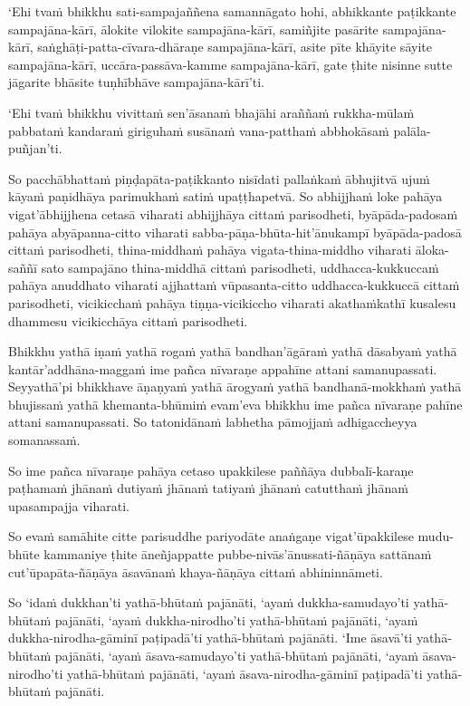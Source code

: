 `Ehi tvaṁ bhikkhu sati-sampajaññena samannāgato hohi, abhikkante paṭikkante sampajāna-kārī, ālokite vilokite sampajāna-kārī, samiñjite pasārite sampajāna-kārī, saṅghāṭi-patta-cīvara-dhāraṇe sampajāna-kārī, asite pīte khāyite sāyite sampajāna-kārī, uccāra-passāva-kamme sampajāna-kārī, gate ṭhite nisinne sutte jāgarite bhāsite tuṇhībhāve sampajāna-kārī'ti.

`Ehi tvaṁ bhikkhu vivittaṁ sen'āsanaṁ bhajāhi araññaṁ rukkha-mūlaṁ pabbataṁ kandaraṁ giriguhaṁ susānaṁ vana-patthaṁ abbhokāsaṁ palāla-puñjan'ti.

So pacchābhattaṁ piṇḍapāta-paṭikkanto nisīdati pallaṅkaṁ ābhujitvā ujuṁ kāyaṁ paṇidhāya parimukhaṁ satiṁ upaṭṭhapetvā. So abhijjhaṁ loke pahāya vigat'ābhijjhena cetasā viharati abhijjhāya cittaṁ parisodheti, byāpāda-padosaṁ pahāya abyāpanna-citto viharati sabba-pāṇa-bhūta-hit'ānukampī byāpāda-padosā cittaṁ parisodheti, thina-middhaṁ pahāya vigata-thina-middho viharati āloka-saññī sato sampajāno thina-middhā cittaṁ parisodheti, uddhacca-kukkuccaṁ pahāya anuddhato viharati ajjhattaṁ vūpasanta-citto uddhacca-kukkuccā cittaṁ parisodheti, vicikicchaṁ pahāya tiṇṇa-vicikiccho viharati akathaṁkathī kusalesu dhammesu vicikicchāya cittaṁ parisodheti.

\suttaRef{[MN 107]}

Bhikkhu yathā iṇaṁ yathā rogaṁ yathā bandhan'āgāraṁ yathā dāsabyaṁ yathā kantār'addhāna-maggaṁ ime pañca nīvaraṇe appahīne attani samanupassati. Seyyathā'pi bhikkhave āṇaṇyaṁ yathā ārogyaṁ yathā bandhanā-mokkhaṁ yathā bhujissaṁ yathā khemanta-bhūmiṁ evam'eva bhikkhu ime pañca nīvaraṇe pahīne attani samanupassati. So tatonidānaṁ labhetha pāmojjaṁ adhigaccheyya somanassaṁ.

So ime pañca nīvaraṇe pahāya cetaso upakkilese paññāya dubbalī-karaṇe paṭhamaṁ jhānaṁ dutiyaṁ jhānaṁ tatiyaṁ jhānaṁ catutthaṁ jhānaṁ upasampajja viharati.

So evaṁ samāhite citte parisuddhe pariyodāte anaṅgaṇe vigat'ūpakkilese mudu-bhūte kammaniye ṭhite āneñjappatte pubbe-nivās'ānussati-ñāṇāya sattānaṁ cut'ūpapāta-ñāṇāya āsavānaṁ khaya-ñāṇāya cittaṁ abhininnāmeti.

So `idaṁ dukkhan'ti yathā-bhūtaṁ pajānāti, `ayaṁ dukkha-samudayo'ti yathā-bhūtaṁ pajānāti, `ayaṁ dukkha-nirodho'ti yathā-bhūtaṁ pajānāti, `ayaṁ dukkha-nirodha-gāminī paṭipadā'ti yathā-bhūtaṁ pajānāti. `Ime āsavā'ti yathā-bhūtaṁ pajānāti, `ayaṁ āsava-samudayo'ti yathā-bhūtaṁ pajānāti, `ayaṁ āsava-nirodho'ti yathā-bhūtaṁ pajānāti, `ayaṁ āsava-nirodha-gāminī paṭipadā'ti yathā-bhūtaṁ pajānāti.

